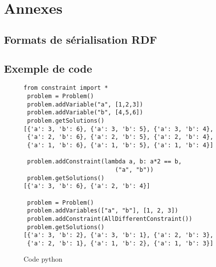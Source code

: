 \newpage
\chapter*{Annexes}

\setcounter{page}{1}



\section{Formats de sérialisation RDF}
\label{annexe/serialisation}





\newpage


\section{Exemple de code}
\label{annexe/espace_nom}

\begin{figure}[!h]
\begin{lstlisting}[frame=single]
 from constraint import *
 problem = Problem()
 problem.addVariable("a", [1,2,3])
 problem.addVariable("b", [4,5,6])
 problem.getSolutions()
[{'a': 3, 'b': 6}, {'a': 3, 'b': 5}, {'a': 3, 'b': 4},
 {'a': 2, 'b': 6}, {'a': 2, 'b': 5}, {'a': 2, 'b': 4},
 {'a': 1, 'b': 6}, {'a': 1, 'b': 5}, {'a': 1, 'b': 4}]

 problem.addConstraint(lambda a, b: a*2 == b,
                          ("a", "b"))
 problem.getSolutions()
[{'a': 3, 'b': 6}, {'a': 2, 'b': 4}]

 problem = Problem()
 problem.addVariables(["a", "b"], [1, 2, 3])
 problem.addConstraint(AllDifferentConstraint())
 problem.getSolutions()
[{'a': 3, 'b': 2}, {'a': 3, 'b': 1}, {'a': 2, 'b': 3},
 {'a': 2, 'b': 1}, {'a': 1, 'b': 2}, {'a': 1, 'b': 3}]
\end{lstlisting}
\caption{Code python}
\end{figure}